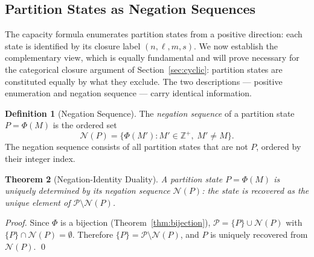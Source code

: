 \documentclass[twocolumn,10pt,a4paper]{article}
\theoremstyle{thmstyle}
\newtheorem{theorem}{Theorem}[section]
\theoremstyle{definition}
\newtheorem{definition}[theorem]{Definition}
\theoremstyle{remark}
\newcommand{\Zp}{\mathbb{Z}^{+}}
\newcommand{\Parts}{\mathcal{P}}
\newcommand{\PhiMap}{\varPhi}
\begin{document}
\subsection{Partition States as Negation Sequences}
\label{sec:negation}

The capacity formula enumerates partition states from a positive direction: each state is identified by its closure label $(n, \ell, m, s)$. We now establish the complementary view, which is equally fundamental and will prove necessary for the categorical closure argument of Section~\ref{sec:cyclic}: partition states are constituted equally by what they exclude. The two descriptions --- positive enumeration and negation sequence --- carry identical information.

\begin{definition}[Negation Sequence]
\label{def:negation}
The \emph{negation sequence} of a partition state $P = \PhiMap(M)$ is the ordered set
\begin{equation}
    \mathcal{N}(P) = \bigl\{ \PhiMap(M') : M' \in \Zp,\; M' \neq M \bigr\}.
\end{equation}
The negation sequence consists of all partition states that are not $P$, ordered by their integer index.
\end{definition}

\begin{theorem}[Negation-Identity Duality]
\label{thm:negation-duality}
A partition state $P = \PhiMap(M)$ is uniquely determined by its negation sequence $\mathcal{N}(P)$: the state is recovered as the unique element of $\Parts \setminus \mathcal{N}(P)$.
\end{theorem}

\begin{proof}
Since $\PhiMap$ is a bijection (Theorem~\ref{thm:bijection}), $\Parts = \{P\} \cup \mathcal{N}(P)$ with $\{P\} \cap \mathcal{N}(P) = \emptyset$. Therefore $\{P\} = \Parts \setminus \mathcal{N}(P)$, and $P$ is uniquely recovered from $\mathcal{N}(P)$. \qed
\end{proof}
\end{document}
